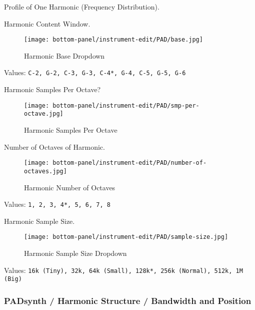    \setcounter{ItemCounter}{0}      %

   Profile of One Harmonic (Frequency Distribution).

   Harmonic Content Window.


\begin{figure}[H]
   \centering 
   \texttt{[image: bottom-panel/instrument-edit/PAD/base.jpg]}
   \caption{Harmonic Base Dropdown}
   \label{fig:padsynth_harmonic_base_dropdown}
\end{figure}

   Values: \texttt{C-2, G-2, C-3, G-3, C-4*, G-4, C-5, G-5, G-6}

   Harmonic Samples Per Octave?

\begin{figure}[H]
   \centering 
   \texttt{[image: bottom-panel/instrument-edit/PAD/smp-per-octave.jpg]}
   \caption{Harmonic Samples Per Octave}
   \label{fig:padsynth_harmonic_samples_per_octave}
\end{figure}

   Number of Octaves of Harmonic.

\begin{figure}[H]
   \centering 
   \texttt{[image: bottom-panel/instrument-edit/PAD/number-of-octaves.jpg]}
   \caption{Harmonic Number of Octaves}
   \label{fig:padsynth_harmonic_number_of_octaves}
\end{figure}

   Values: \texttt{1, 2, 3, 4*, 5, 6, 7, 8}

   Harmonic Sample Size.

\begin{figure}[H]
   \centering 
   \texttt{[image: bottom-panel/instrument-edit/PAD/sample-size.jpg]}
   \caption{Harmonic Sample Size Dropdown}
   \label{fig:padsynth_harmonic_sample_size_dropdown}
\end{figure}

   Values: \texttt{16k (Tiny), 32k, 64k (Small), 128k*, 256k (Normal), 512k, 1M (Big)}

\subsubsection{PADsynth / Harmonic Structure / Bandwidth and Position}
\label{subsubsec:padsynth_harmonic_structure_bw_and_pos}

